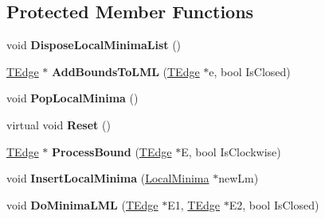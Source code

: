 \subsection*{Protected Member Functions}
\begin{DoxyCompactItemize}
\item 
\mbox{\label{classClipperLib_1_1ClipperBase_a311dbbec1454ab7965e363a0359f5ee4}} 
void {\bfseries Dispose\+Local\+Minima\+List} ()
\item 
\mbox{\label{classClipperLib_1_1ClipperBase_a906ea17c9dc8822d689e54c3243e7f58}} 
\hyperlink{structClipperLib_1_1TEdge}{T\+Edge} $\ast$ {\bfseries Add\+Bounds\+To\+L\+ML} (\hyperlink{structClipperLib_1_1TEdge}{T\+Edge} $\ast$e, bool Is\+Closed)
\item 
\mbox{\label{classClipperLib_1_1ClipperBase_a9554e9f2273c39e0f5f07d3cd73533e6}} 
void {\bfseries Pop\+Local\+Minima} ()
\item 
\mbox{\label{classClipperLib_1_1ClipperBase_a125febb065f23fc55dafffe8d185b642}} 
virtual void {\bfseries Reset} ()
\item 
\mbox{\label{classClipperLib_1_1ClipperBase_a292655c74a7e70a8b8829337c632bdf0}} 
\hyperlink{structClipperLib_1_1TEdge}{T\+Edge} $\ast$ {\bfseries Process\+Bound} (\hyperlink{structClipperLib_1_1TEdge}{T\+Edge} $\ast$E, bool Is\+Clockwise)
\item 
\mbox{\label{classClipperLib_1_1ClipperBase_aa62506f423172bccd6de8a645cc29cff}} 
void {\bfseries Insert\+Local\+Minima} (\hyperlink{structClipperLib_1_1LocalMinima}{Local\+Minima} $\ast$new\+Lm)
\item 
\mbox{\label{classClipperLib_1_1ClipperBase_ae57efb542cfbbc42d000815e8a2e2877}} 
void {\bfseries Do\+Minima\+L\+ML} (\hyperlink{structClipperLib_1_1TEdge}{T\+Edge} $\ast$E1, \hyperlink{structClipperLib_1_1TEdge}{T\+Edge} $\ast$E2, bool Is\+Closed)
\item 
\mbox{\label{classClipperLib_1_1ClipperBase_a13086e8d650edc1a024813d3a8469120}} 

\end{DoxyCompactItemize}
